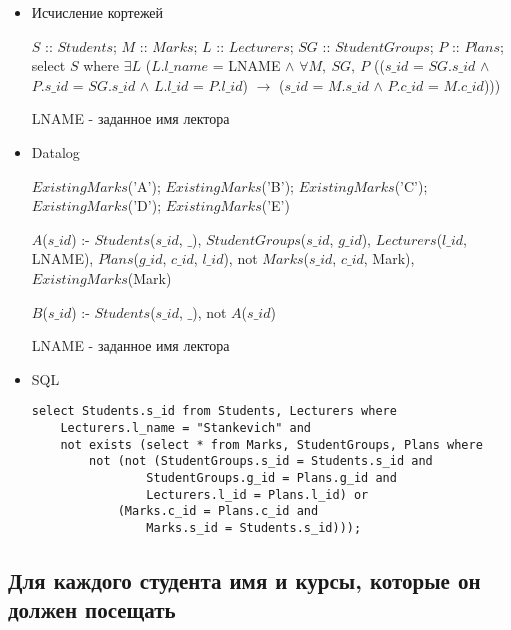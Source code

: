 \documentclass[12pt,a4paper,oneside]{article}
\begin{document}
\begin{itemize}

\item Исчисление кортежей

$S$ :: $Students$; $M$ :: $Marks$; $L$ :: $Lecturers$; $SG$ :: $StudentGroups$; $P$ :: $Plans$; select $S$ where $\exists L$ ($L.l\_name$ = LNAME $\wedge$ $\forall M,\ SG,\ P$ (($s\_id$ = $SG.s\_id$ $\wedge$ $P.s\_id$ = $SG.s\_id$ $\wedge$ $L.l\_id$ = $P.l\_id$) $\rightarrow$ ($s\_id$ = $M.s\_id$ $\wedge$ $P.c\_id$ = $M.c\_id$)))

LNAME - заданное имя лектора

\item Datalog

$ExistingMarks$('A');
$ExistingMarks$('B');
$ExistingMarks$('C');
$ExistingMarks$('D');
$ExistingMarks$('E')

$A$($s\_id$) :- $Students$($s\_id$, $\_$), $StudentGroups$($s\_id$, $g\_id$), $Lecturers$($l\_id$, LNAME), $Plans$($g\_id$, $c\_id$, $l\_id$), not $Marks$($s\_id$, $c\_id$, Mark), $ExistingMarks$(Mark)

$B$($s\_id$) :- $Students$($s\_id$, $\_$), not $A$($s\_id$)

LNAME - заданное имя лектора

\item SQL

\begin{lstlisting}[label=task5,caption={Задание 5}]
select Students.s_id from Students, Lecturers where
    Lecturers.l_name = "Stankevich" and
    not exists (select * from Marks, StudentGroups, Plans where
        not (not (StudentGroups.s_id = Students.s_id and
                StudentGroups.g_id = Plans.g_id and
                Lecturers.l_id = Plans.l_id) or
            (Marks.c_id = Plans.c_id and
                Marks.s_id = Students.s_id)));
\end{lstlisting}

\end{itemize}

\subsection{Для каждого студента имя и курсы, которые он должен посещать}
\end{document}
